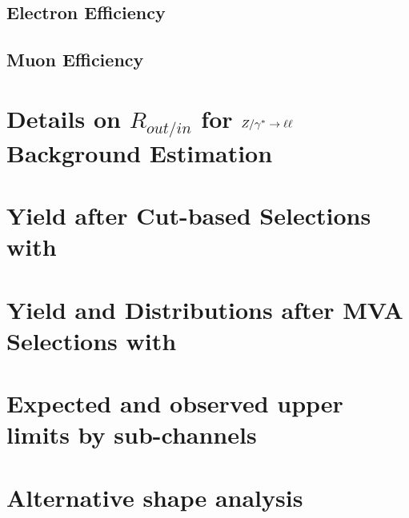 \documentclass{cmspaper}
\begin{document}
     \subsection{Electron Efficiency}
     
     \subsection{Muon Efficiency}
     

\clearpage 

\section{ Details on $R_{out/in}$ for $Z/\gamma^*\to\ell\ell$ Background Estimation}
     \label{app:appendix_dyr}
     
\clearpage




\clearpage 

  \section{Yield after Cut-based Selections with \intlumi }
     \label{app:appendix_cutresults}
     
\clearpage

  \section{Yield and Distributions after MVA Selections with \intlumi }
     \label{app:appendix_bdtresults}
     

\clearpage

  \section{Expected and observed upper limits by sub-channels}
     \label{app:subchannels}
     

\clearpage
  \section{Alternative shape analysis}
     \label{app:appendix_altshape}
     
\end{document}
